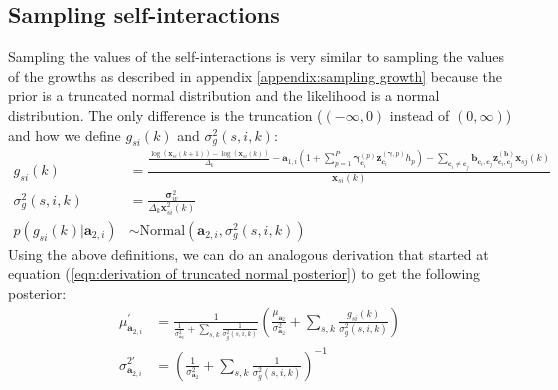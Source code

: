 \documentclass{article}
\newcommand{\Normaldist}{\text{Normal}}
\newcommand{\ci}[1]{\mathbf{c}_{#1}}
\newcommand{\growthi}[1]{\mathbf{a}_{1,#1}}
\newcommand{\si}{\mathbf{a}_2}
\newcommand{\sii}[1]{\mathbf{a}_{2,#1}}
\newcommand{\meansi}{\mu_{\si}}
\newcommand{\varsi}{\sigma^2_{\si}}
\newcommand{\interact}{\mathbf{b}}
\newcommand{\interactcij}[2]{\interact_{\ci{#1}, \ci{#2}}}
\newcommand{\zinteractcij}[2]{\mathbf{z}^{(\interact)}_{\ci{#1}, \ci{#2}}}
\newcommand{\pert}{\mathbf{\gamma}}
\newcommand{\pertic}[2]{\mathbf{\gamma}^{(#1)}_{\ci{#2}}} %
\newcommand{\zpertic}[2]{\mathbf{z}^{(\pert, #1)}_{\ci{#2}}}
\newcommand{\stepperti}[1]{h_{#1}}
\newcommand{\pv}{\mathbf{\sigma}_w^2}
\newcommand{\varsik}[4]{#1_{#2 #3}(#4)}
\newcommand{\xsik}[3]{\mathbf{x}_{#1 #2}(#3)}
\newcommand{\xsikexp}[4]{\mathbf{x}^{#4}_{#1 #2}(#3)}
\newcommand{\dt}{\Delta_k}
\begin{document}
\begin{appendices}
\subsection{Sampling self-interactions}
Sampling the values of the self-interactions is very similar to sampling the values of the growths as described in appendix \ref{appendix:sampling growth} because the prior is a truncated normal distribution and the likelihood is a normal distribution. The only difference is the truncation ($(-\infty , 0)$ instead of $(0, \infty)$) and how we define $\varsik{g}{s}{i}{k}$ and $\sigma^2_g (s,i,k)$:
\begin{align}
    \varsik{g}{s}{i}{k} & = 
        \frac{
            \frac
                {\log (\xsik{s}{i}{k+1}) - \log (\xsik{s}{i}{k}) }{\dt}
                - \growthi{i} \left(
                    1 + \sum_{p=1}^P \pertic{p}{i} \zpertic{p}{i} \stepperti{p}
                \right)
                    - \sum_{\ci{i} \neq \ci{j}}
                        \interactcij{i}{j} 
                        \zinteractcij{i}{j}
                        \xsik{s}{j}{k}
        }
        {
            \xsik{s}{i}{k}
        } \\
    \sigma^2_g (s,i,k) & = \frac{\pv}
        {
            \dt \xsikexp{s}{i}{k}{2}
        }\\
    p(\varsik{g}{s}{i}{k} | \sii{i}) & \sim  \Normaldist \left(
        \sii{i}, \sigma^2_g (s,i,k)
    \right)
\end{align}
Using the above definitions, we can do an analogous derivation that started at equation (\ref{eqn:derivation of truncated normal posterior}) to get the following posterior:
\begin{align}
    \mu_{\sii{i}}^{'} & = \frac{1}
        {\frac{1}{\varsi} + 
        \sum_{s,k} \frac{1}{\sigma_g^2 (s,i,k) } } 
        \left(
            \frac{\meansi}{\varsi} + 
            \sum_{s,k} \frac{\varsik{g}{s}{i}{k}}{\sigma^2_g (s,i,k)}
        \right) \\
    \sigma^{2'}_{\sii{i}} & = \left(
        \frac{1}{\varsi} +
        \sum_{s,k} \frac{1}{\sigma^2_g (s,i,k)}
    \right)^{-1}
\end{align}

\end{appendices}
\end{document}
